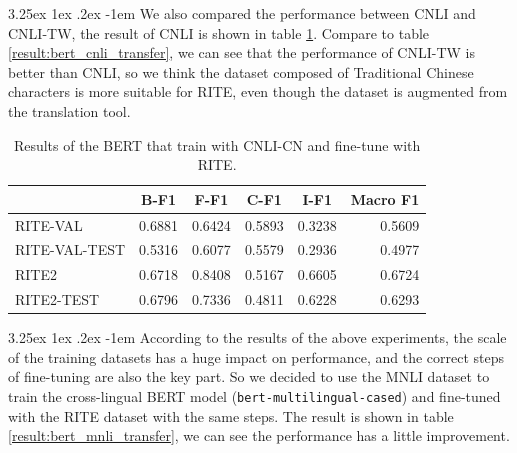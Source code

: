 \documentclass[12pt]{article}
\makeatletter
\renewcommand\paragraph{\@startsection{paragraph}{5}{\z@}%
  {3.25ex \@plus1ex \@minus.2ex}%
  {-1em}%
  {\normalfont\normalsize\bfseries}}
\makeatother
\begin{document}
\begin{CJK*}{UTF8}{bkai}
\begin{spacing}{1.77}
\paragraph{}
We also compared the performance between CNLI and CNLI-TW, the result of CNLI is shown in table \ref{result:bert_cnli_cn}. Compare to table \ref{result:bert_cnli_transfer}, we can see that the performance of CNLI-TW is better than CNLI, so we think the dataset composed of Traditional Chinese characters is more suitable for RITE, even though the dataset is augmented from the translation tool.

\begin{table}[H]
  \centering
  \setlength{\extrarowheight}{-3pt}
  \begin{tabular}{|l|r|r|r|r|r|}
  \hline
   & \multicolumn{1}{c|}{B-F1} & \multicolumn{1}{c|}{F-F1} & \multicolumn{1}{c|}{C-F1} & \multicolumn{1}{c|}{I-F1} & \multicolumn{1}{c|}{Macro F1} \\ \hline
  RITE-VAL & 0.6881 & 0.6424 & 0.5893 & 0.3238 & 0.5609 \\ \hline
  RITE-VAL-TEST & 0.5316 & 0.6077 & 0.5579 & 0.2936 & 0.4977 \\ \hline
  RITE2 & 0.6718 & 0.8408 & 0.5167 & 0.6605 & 0.6724 \\ \hline
  RITE2-TEST & 0.6796 & 0.7336 & 0.4811 & 0.6228 & 0.6293 \\ \hline
  \end{tabular}
  \caption{Results of the BERT that train with CNLI-CN and fine-tune with RITE.}
  \label{result:bert_cnli_cn}
\end{table}

\paragraph{}
According to the results of the above experiments, the scale of the training datasets has a huge impact on performance, and the correct steps of fine-tuning are also the key part. So we decided to use the MNLI dataset to train the cross-lingual BERT model (\texttt{bert-multilingual-cased}) and fine-tuned with the RITE dataset with the same steps. The result is shown in table \ref{result:bert_mnli_transfer}, we can see the performance has a little improvement.


\end{spacing}
\end{CJK*}
\end{document}

